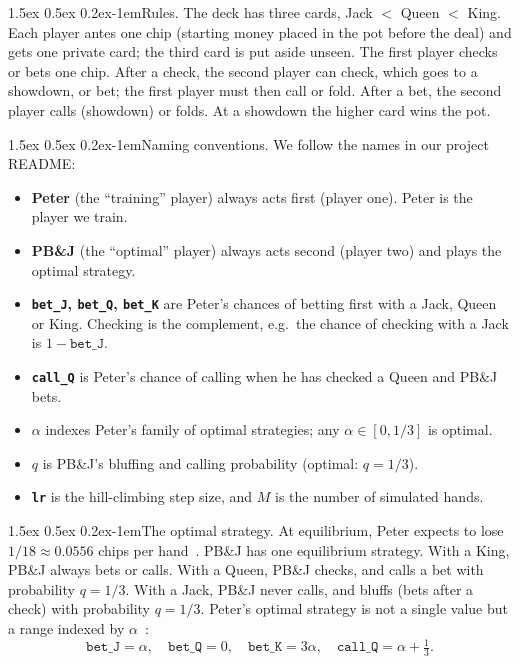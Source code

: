 \documentclass{article}
\makeatletter
\renewcommand{\paragraph}{\@startsection{paragraph}{4}{\z@}%
    {1.5ex \@plus 0.5ex \@minus 0.2ex}{-1em}{\normalsize\bf}}
\newcommand{\code}[1]{\texttt{#1}}
\newcommand{\peter}{Peter}
\newcommand{\pbj}{PB\&J}
\makeatother
\begin{document}
\paragraph{Rules.} The deck has three cards, Jack $<$ Queen $<$ King. Each
player antes one chip (starting money placed in the pot before the deal) and
gets one private card; the third card is put aside unseen. The first player
checks or bets one chip. After a check, the second player can check, which
goes to a showdown, or bet; the first player must then call or fold. After a
bet, the second player calls (showdown) or folds. At a showdown the higher card
wins the pot.

\paragraph{Naming conventions.} We follow the names in our project README:
\begin{itemize}\itemsep0pt
  \item \textbf{\peter} (the ``training'' player) always acts first (player
  one). \peter{} is the player we train.
  \item \textbf{\pbj} (the ``optimal'' player) always acts second (player
  two) and plays the optimal strategy.
  \item \textbf{\code{bet\_J}, \code{bet\_Q}, \code{bet\_K}} are \peter's
  chances of betting first with a Jack, Queen or King. Checking is the
  complement, e.g.\ the chance of checking with a Jack is $1 - \code{bet\_J}$.
  \item \textbf{\code{call\_Q}} is \peter's chance of calling when he has
  checked a Queen and \pbj{} bets.
  \item \textbf{$\alpha$} indexes \peter's family of optimal strategies; any
  $\alpha \in [0, 1/3]$ is optimal.
  \item \textbf{$q$} is \pbj's bluffing and calling probability (optimal:
  $q = 1/3$).
  \item \textbf{\code{lr}} is the hill-climbing step size, and \textbf{$M$} is
  the number of simulated hands.
\end{itemize}

\paragraph{The optimal strategy.} At equilibrium, \peter{} expects to lose
$1/18 \approx 0.0556$ chips per hand~\cite{wiki}. \pbj{} has one equilibrium
strategy. With a King, \pbj{} always bets or calls. With a Queen, \pbj{}
checks, and calls a bet with probability $q = 1/3$. With a Jack, \pbj{} never
calls, and bluffs (bets after a check) with probability $q = 1/3$. \peter's
optimal strategy is not a single value but a range indexed by
$\alpha$~\cite{wiki,kuhn1950}:
\begin{equation}
  \code{bet\_J} = \alpha, \quad \code{bet\_Q} = 0, \quad
  \code{bet\_K} = 3\alpha, \quad \code{call\_Q} = \alpha + \tfrac13.
  \label{eq:equilibrium}
\end{equation}
\end{document}
